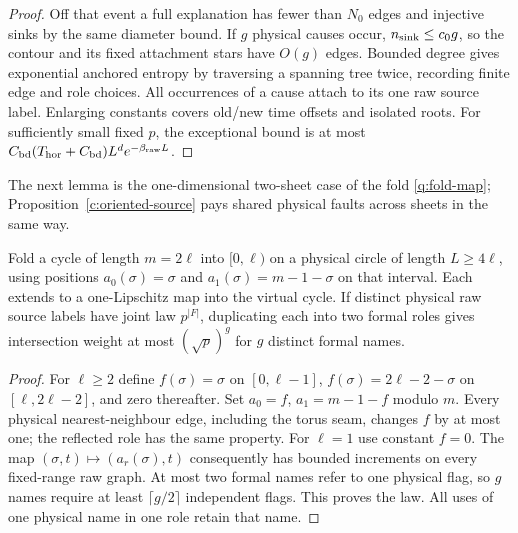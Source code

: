 \begin{proof}
Off that event a full explanation has fewer than \(N_0\) edges and
injective sinks by the same diameter bound. If \(g\) physical causes
occur, \(n_{\rm sink}\le c_0g\), so the contour and its fixed attachment
stars have \(O(g)\) edges. Bounded degree gives exponential anchored
entropy by traversing a spanning tree twice, recording finite edge
and role choices. All occurrences of a cause attach to its one raw
source label. Enlarging constants covers old/new time offsets and isolated roots.
For sufficiently small fixed \(p\), the exceptional bound is at most
\(C_{\rm bd}(T_{\rm hor}+C_{\rm bd})L^d e^{-\beta_{\rm raw}L}\).
\end{proof}

The next lemma is the one-dimensional two-sheet case of the fold
\eqref{q:fold-map}; Proposition~\ref{c:oriented-source} pays shared
physical faults across sheets in the same way.

\begin{lemma}\label{f4:roles}
Fold a cycle of length \(m=2\ell\) into \([0,\ell)\) on a physical
circle of length \(L\ge4\ell\), using positions \(a_0(\sigma)=\sigma\)
and \(a_1(\sigma)=m-1-\sigma\) on that interval. Each extends to a
one-Lipschitz map into the virtual cycle. If distinct physical raw source labels have joint law \(p^{|F|}\),
duplicating each into two formal roles gives intersection weight at most
\((\sqrt p)^g\) for \(g\) distinct formal names.
\end{lemma}
\begin{proof}
For \(\ell\ge2\) define \(f(\sigma)=\sigma\) on \([0,\ell-1]\),
\(f(\sigma)=2\ell-2-\sigma\) on \([\ell,2\ell-2]\), and zero
thereafter. Set \(a_0=f\), \(a_1=m-1-f\) modulo \(m\).
Every physical nearest-neighbour edge, including the torus seam,
changes \(f\) by at most one; the reflected role has the same property.
For \(\ell=1\) use constant \(f=0\). The map
\((\sigma,t)\mapsto(a_r(\sigma),t)\) consequently has bounded
increments on every fixed-range raw graph. At most two formal names
refer to one physical flag, so \(g\) names require at least
\(\lceil g/2\rceil\) independent flags. This proves the law.
All uses of one physical name in one role retain that name.
\end{proof}
